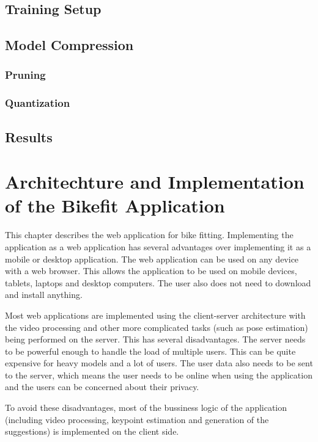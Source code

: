 \section{Training Setup}
\section{Model Compression}

\subsection{Pruning}

\subsection{Quantization}
\section{Results}


\chapter{Architechture and Implementation of the Bikefit Application}
\label{ch:bikefit_application}

This chapter describes the web application for bike fitting. Implementing the application as a web application has several advantages over implementing it as a mobile or desktop application. The web application can be used on any device with a web browser. This allows the application to be used on mobile devices, tablets, laptops and desktop computers. The user also does not need to download and install anything.

Most web applications are implemented using the client-server architecture with the video processing and other more complicated tasks (such as pose estimation) being performed on the server. This has several disadvantages. The server needs to be powerful enough to handle the load of multiple users. This can be quite expensive for heavy models and a lot of users. The user data also needs to be sent to the server, which means the user needs to be online when using the application and the users can be concerned about their privacy.

To avoid these disadvantages, most of the bussiness logic of the application (including video processing, keypoint estimation and generation of the suggestions) is implemented on the client side.

